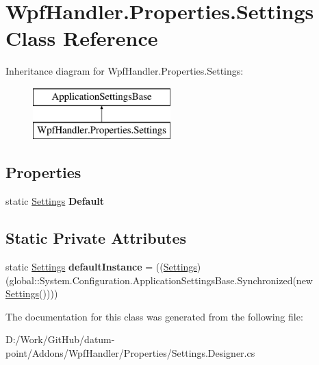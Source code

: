 \hypertarget{class_wpf_handler_1_1_properties_1_1_settings}{}\section{Wpf\+Handler.\+Properties.\+Settings Class Reference}
\label{class_wpf_handler_1_1_properties_1_1_settings}
Inheritance diagram for Wpf\+Handler.\+Properties.\+Settings\+:\begin{figure}[H]
\begin{center}
\leavevmode
\includegraphics[height=2.000000cm]{d7/d4f/class_wpf_handler_1_1_properties_1_1_settings}
\end{center}
\end{figure}
\subsection*{Properties}
\begin{DoxyCompactItemize}
\item 
\mbox{\label{class_wpf_handler_1_1_properties_1_1_settings_a252db64811cbf5a2fccc03433c9566c3}} 
static \mbox{\hyperlink{class_wpf_handler_1_1_properties_1_1_settings}{Settings}} {\bfseries Default}
\end{DoxyCompactItemize}
\subsection*{Static Private Attributes}
\begin{DoxyCompactItemize}
\item 
\mbox{\label{class_wpf_handler_1_1_properties_1_1_settings_a7b2e360d53ec59976635347e45223008}} 
static \mbox{\hyperlink{class_wpf_handler_1_1_properties_1_1_settings}{Settings}} {\bfseries default\+Instance} = ((\mbox{\hyperlink{class_wpf_handler_1_1_properties_1_1_settings}{Settings}})(global\+::\+System.\+Configuration.\+Application\+Settings\+Base.\+Synchronized(new \mbox{\hyperlink{class_wpf_handler_1_1_properties_1_1_settings}{Settings}}())))
\end{DoxyCompactItemize}


The documentation for this class was generated from the following file\+:\begin{DoxyCompactItemize}
\item 
D\+:/\+Work/\+Git\+Hub/datum-\/point/\+Addons/\+Wpf\+Handler/\+Properties/Settings.\+Designer.\+cs\end{DoxyCompactItemize}
